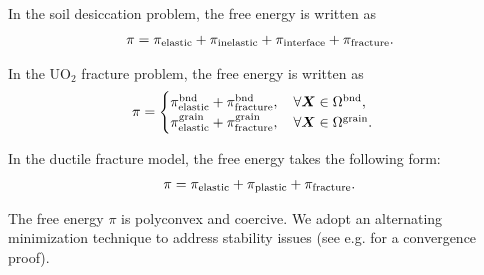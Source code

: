 \begin{frame}{}
In the soil desiccation problem, the free energy is written as
\begin{align}
    \pi = \pi_{\text{elastic}} + \pi_{\text{inelastic}} + \pi_{\text{interface}} + \pi_{\text{fracture}}.
\end{align}

In the UO$_2$ fracture problem, the free energy is written as
\begin{align}
    \pi =
    \begin{cases}
        \pi_{\text{elastic}}^\text{bnd} + \pi_{\text{fracture}}^\text{bnd}, \quad \forall \boldsymbol{X} \in \Omega^\text{bnd}, \\
        \pi_{\text{elastic}}^\text{grain} + \pi_{\text{fracture}}^\text{grain}, \quad \forall \boldsymbol{X} \in \Omega^\text{grain}.
    \end{cases}
\end{align}

In the ductile fracture model, the free energy takes the following form:
\begin{align}
    \pi = \pi_{\text{elastic}} + \pi_{\text{plastic}} + \pi_{\text{fracture}}.
\end{align}

The free energy $\pi$ is polyconvex and coercive. We adopt an alternating minimization technique to address stability issues (see e.g. \cite{hong2017linear} for a convergence proof).
\end{frame}

